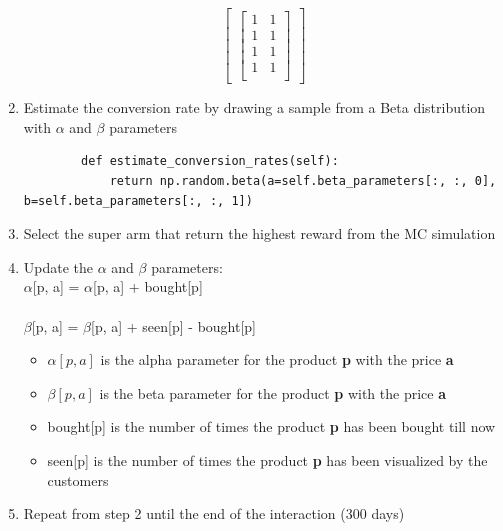 \begin{enumerate}
\[\begin{bmatrix}
\begin{bmatrix}
        1 & 1\\
        1 & 1\\
        1 & 1\\
        1 & 1\\
    \end{bmatrix}
    \end{bmatrix} \]
    \item Estimate the conversion rate by drawing a sample from a Beta distribution with $\alpha$ and $\beta$ parameters \begin{verbatim}
        def estimate_conversion_rates(self):
            return np.random.beta(a=self.beta_parameters[:, :, 0], b=self.beta_parameters[:, :, 1])
        \end{verbatim}
    \item Select the super arm that return the highest reward from the MC simulation
    \item Update the $\alpha$ and $\beta$ parameters:\\
        $\alpha$[p, a] = $\alpha$[p, a] + bought[p]\\\\
        $\beta$[p, a] = $\beta$[p, a] + seen[p] - bought[p]
    \begin{itemize}
        \item $\alpha[p, a]$ is the alpha parameter for the product {\bf p} with the price {\bf a}
        \item $\beta[p, a]$ is the beta parameter for the product {\bf p} with the price {\bf a}
        \item bought[p] is the number of times the product {\bf p} has been bought till now
        \item seen[p] is the number of times the product {\bf p} has been visualized by the customers
    \end{itemize}
    \item Repeat from step 2 until the end of the interaction (300 days)
\end{enumerate}
